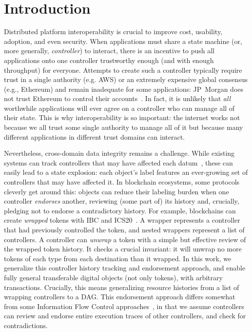 \documentclass[a4paper,USenglish,cleveref, autoref, thm-restate, anonymous]{lipics-v2021}
\begin{document}
\section{Introduction}
Distributed platform interoperability is crucial to improve cost, usability, adoption, and even security. 
When applications must share a state machine (or, more generally, \emph{controller}) to interact, there is an incentive to push all applications onto one controller trustworthy enough (and with enough throughput) for everyone. 
Attempts to create such a controller typically require trust in a single authority (e.g. AWS\cite{citation-needed}) or an extremely expensive global consensus (e.g., Ethereum) and remain inadequate for some applications:
 JP~Morgan does not trust Ethereum to control their accounts~\cite{onyx}.
In fact, it is unlikely that \emph{all} worthwhile applications will ever agree on a controller who can manage all of their state.
This is why interoperability is so important: the internet works not because we all trust some single authority to manage all of it but because many different applications in different trust domains can interact. 

Nevertheless, cross-domain data integrity remains a challenge.
While  existing systems can track controllers that may have affected each datum~\cite{dista,fabric}, these can easily lead to a state explosion: each object's label features an ever-growing set of controllers that may have affected it. 
In blockchain ecosystems, some protocols cleverly get around this: objects can reduce their labeling burden when one controller \emph{endorses} another, reviewing (some part of) its history and, crucially, pledging not to endorse a contradictory history.
For example, blockchains can create \emph{wrapped} tokens with IBC and ICS20~\cite{wrapped,ibc, ics20}. 
A wrapper represents a controller that had previously controlled the token, and nested wrappers represent a list of controllers. 
A controller can \emph{unwrap} a token with a simple but effective review of the wrapped token history. 
It checks a crucial invariant: it will unwrap no more tokens of each type from each destination than it wrapped. 
In this work, we generalize this controller history tracking and endorsement approach, and enable fully general transferable digital objects (not only tokens), with arbitrary transactions. 
Crucially, this means generalizing resource histories from a list of wrapping controllers to a DAG.
This endorsement approach differs somewhat from some Information Flow Control approaches~\cite{fabric, citation-needed}, in that we assume controllers can review and endorse entire execution traces of other controllers, and check for contradictions.
\end{document}
